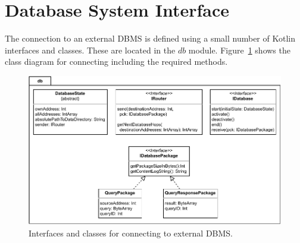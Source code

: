 \documentclass[english,version-2019-11]{uzl-thesis}
\begin{document}
\section{Database System Interface}
The connection to an external DBMS is defined using a small number of Kotlin interfaces and classes. These are located in the $db$ module. Figure~\ref{figure_db_classes} shows the class diagram for connecting including the required methods.
\begin{figure}[htpb]
  \centering
  \includegraphics{figure_db_classes.pdf}
  \caption{Interfaces and classes for connecting to external DBMS.}
  \label{figure_db_classes}
\end{figure}
\end{document}
